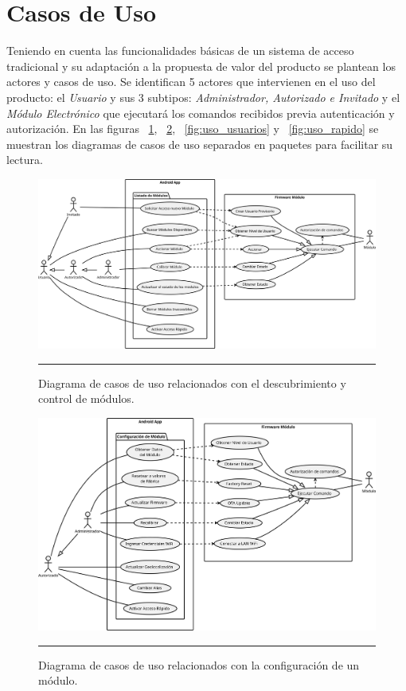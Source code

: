 \section{Casos de Uso}
\label{section:casos_de_uso}
Teniendo en cuenta las funcionalidades básicas de un sistema de acceso tradicional y su adaptación a la propuesta de valor del producto se plantean los actores y casos de uso. %
Se identifican 5 actores que intervienen en el uso del producto: el \emph{Usuario} y sus 3 subtipos: \emph{Administrador, Autorizado e Invitado} y el \emph{Módulo Electrónico} que ejecutará los comandos recibidos previa autenticación y autorización.
En las figuras ~\ref{fig:uso_listado}, ~\ref{fig:uso_config}, ~\ref{fig:uso_usuarios} y ~\ref{fig:uso_rapido} se muestran los diagramas de casos de uso separados en paquetes para facilitar su lectura.
\begin{figure}[htbp]
	\centering
	\includegraphics[width=\textwidth]{Figures/reque/USE_listado.png}
	\rule{35em}{1pt}
	\caption[Diagrama de Casos de Uso I]{Diagrama de casos de uso relacionados con el descubrimiento y control de módulos.}
	\label{fig:uso_listado}
\end{figure}

\begin{figure}[htbp]
	\centering
	\includegraphics[width=\textwidth]{Figures/reque/USE_config.png}
	\rule{35em}{1pt}
	\caption[Diagrama de Casos de Uso II]{Diagrama de casos de uso relacionados con la configuración de un módulo.}
	\label{fig:uso_config}
\end{figure}

